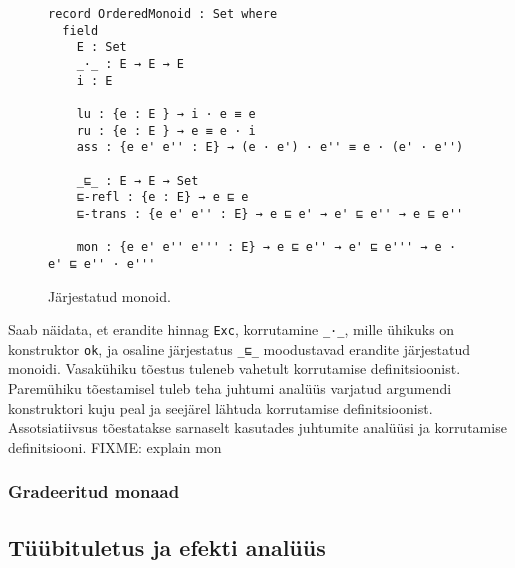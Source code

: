 \documentclass[a4paper,12pt]{article}
\begin{document}
\begin{figure}
  \begin{verbatim}
record OrderedMonoid : Set where
  field
    E : Set
    _·_ : E → E → E    
    i : E

    lu : {e : E } → i · e ≡ e
    ru : {e : E } → e ≡ e · i 
    ass : {e e' e'' : E} → (e · e') · e'' ≡ e · (e' · e'')
    
    _⊑_ : E → E → Set    
    ⊑-refl : {e : E} → e ⊑ e
    ⊑-trans : {e e' e'' : E} → e ⊑ e' → e' ⊑ e'' → e ⊑ e''

    mon : {e e' e'' e''' : E} → e ⊑ e'' → e' ⊑ e''' → e · e' ⊑ e'' · e'''\end{verbatim}
  \caption{Järjestatud monoid.}
  \label{fig:ordered-monoid}
\end{figure}

Saab näidata, et erandite hinnag {\tt Exc},
korrutamine {\tt _·_}, mille ühikuks on konstruktor {\tt ok},
ja osaline järjestatus {\tt _⊑_} moodustavad erandite järjestatud monoidi.
Vasakühiku tõestus tuleneb vahetult korrutamise definitsioonist.
Paremühiku tõestamisel tuleb teha juhtumi analüüs varjatud argumendi konstruktori kuju peal
ja seejärel lähtuda korrutamise definitsioonist.
Assotsiatiivsus tõestatakse sarnaselt kasutades juhtumite analüüsi ja korrutamise definitsiooni.
FIXME: explain mon


\subsubsection{Gradeeritud monaad}


  
\subsection{Tüübituletus ja efekti analüüs} \label{ssec:exc.inference}
\end{document}
